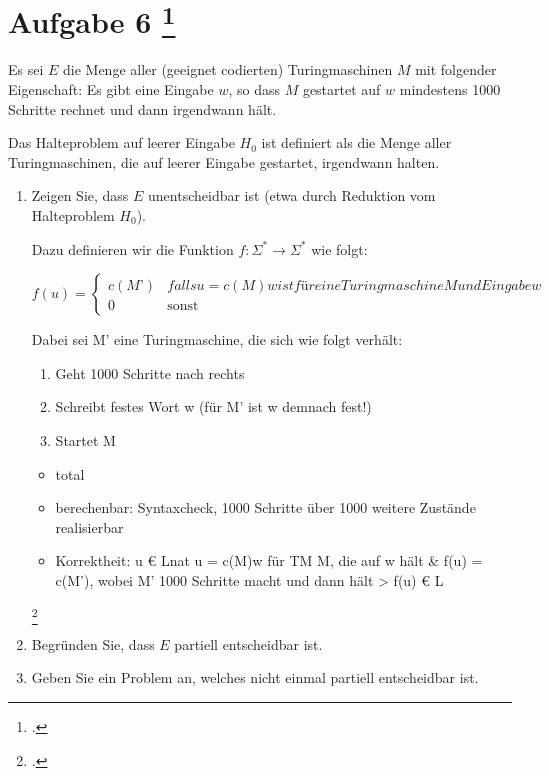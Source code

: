 \documentclass{lehramt-informatik-aufgabe}
\begin{document}
\section{Aufgabe 6
\footcite{66115:2017:03}}

Es sei $E$ die Menge aller (geeignet codierten) Turingmaschinen $M$ mit
folgender Eigenschaft: Es gibt eine Eingabe $w$, so dass $M$ gestartet
auf $w$ mindestens 1000 Schritte rechnet und dann irgendwann hält.

Das Halteproblem auf leerer Eingabe $H_0$ ist definiert als die Menge
aller Turingmaschinen, die auf leerer Eingabe gestartet, irgendwann
halten.

\begin{enumerate}


\item Zeigen Sie, dass $E$ unentscheidbar ist (etwa durch Reduktion vom
Halteproblem $H_0$).

\begin{liAntwort}
Dazu definieren wir die Funktion $f : \Sigma^* \rightarrow \Sigma^*$ wie
folgt:

\begin{equation*}
f(u) =
\begin{cases}
c(M’) &
falls u = c(M)w ist für eine Turingmaschine M und Eingabe w\\

0 & \text{sonst}
\end{cases}
\end{equation*}

Dabei sei M’ eine Turingmaschine, die sich wie folgt verhält:
\begin{enumerate}
\item Geht 1000 Schritte nach rechts
\item Schreibt festes Wort w (für M’ ist w demnach fest!)
\item Startet M
\end{enumerate}

\begin{itemize}
\item total

\item berechenbar: Syntaxcheck, 1000 Schritte über 1000 weitere Zustände
realisierbar

\item Korrektheit: u € Lnat  u = c(M)w für TM M, die auf w hält & f(u) =
c(M’), wobei M’ 1000 Schritte macht und dann hält > f(u) € L
\end{itemize}
\end{liAntwort}
\footcite[Seite 54]{theo:fs:4}


\item Begründen Sie, dass $E$ partiell entscheidbar ist.


\item Geben Sie ein Problem an, welches nicht einmal partiell
entscheidbar ist.

\end{enumerate}
\end{document}
